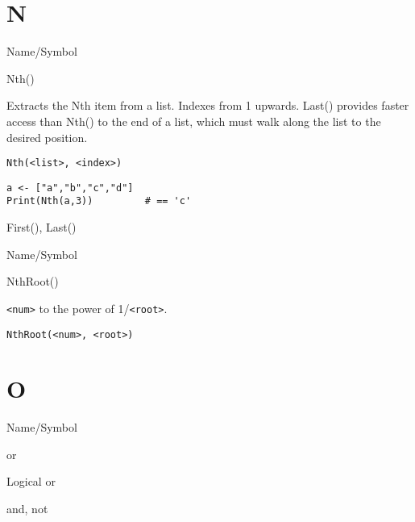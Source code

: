 \rl
\section{N}
\rl



\begin{desc}{Name/Symbol}
\item[Name/Symbol]	Nth()

\item[Description]	Extracts the Nth item from a list.  Indexes from 1 upwards.
		Last() provides faster access than Nth() to the end of a list, 
		which must walk along the list to the desired position.

\item[Usage]
\begin{verbatim}
Nth(<list>, <index>)
\end{verbatim}

\item[Example]	
\begin{verbatim}
a <- ["a","b","c","d"]
Print(Nth(a,3)) 		# == 'c'
\end{verbatim}

\item[See Also]	First(), Last() 
\end{desc}

\rl


\begin{desc}{Name/Symbol}
\item[Name/Symbol]	NthRoot()

\item[Description]	\verb+<num>+ to the power of  1/\verb+<root>+.

\item[Usage]		
\begin{verbatim}
NthRoot(<num>, <root>)
\end{verbatim}

\item[Example]	

\item[See Also]	
\end{desc}

\rl
\section{O}
\rl


\begin{desc}{Name/Symbol}
\item[Name/Symbol]	or                   

\item[Description]	Logical or

\item[Usage]		

\item[Example]	

\item[See Also]	and, not
\end{desc}


